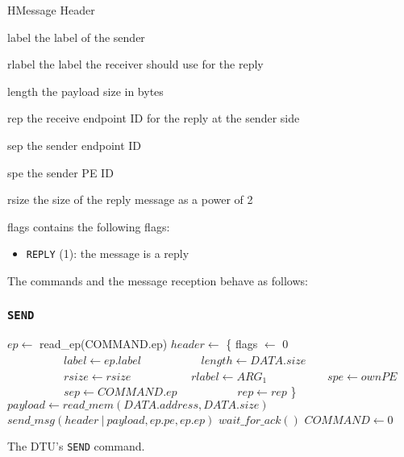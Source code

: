 \documentclass[a4paper,11pt,draft]{article}
\begin{document}
\begin{register}{H}{Message Header}{}
  \regnewline%
  \regnewline%
  \begin{regdesc}\begin{reglist}
    \item[label] the label of the sender
    \item[rlabel] the label the receiver should use for the reply
    \item[length] the payload size in bytes
    \item[rep] the receive endpoint ID for the reply at the sender side
    \item[sep] the sender endpoint ID
    \item[spe] the sender PE ID
    \item[rsize] the size of the reply message as a power of 2
    \item[flags] contains the following flags:
    \begin{itemize}
      \item \texttt{REPLY} (1): the message is a reply
    \end{itemize}
  \end{reglist}\end{regdesc}
\end{register}

\noindent The commands and the message reception behave as follows:

\subsubsection{\texttt{SEND}}

\begin{algorithm}[H]
    $ep \gets$ read\_ep(COMMAND.ep)\;
    \BlankLine
    \BlankLine
    $header \gets$ \{ flags $\gets$ 0\;
    $\quad\quad\quad\quad\quad label \gets ep.label$\;
    $\quad\quad\quad\quad\quad length \gets DATA.size$\;
    $\quad\quad\quad\quad\quad rsize \gets rsize$\;
    $\quad\quad\quad\quad\quad rlabel \gets ARG_1$\;
    $\quad\quad\quad\quad\quad spe \gets ownPE$\;
    $\quad\quad\quad\quad\quad sep \gets COMMAND.ep$\;
    $\quad\quad\quad\quad\quad rep \gets rep$ \}\;
    $payload \gets read\_mem(DATA.address, DATA.size)$\;
    $send\_msg(header\ |\ payload, ep.pe, ep.ep)$\;
    $wait\_for\_ack()$\;
    \BlankLine
    $COMMAND \gets 0$\;
    \caption{The DTU's \texttt{SEND} command.}
\end{algorithm}
\end{document}
